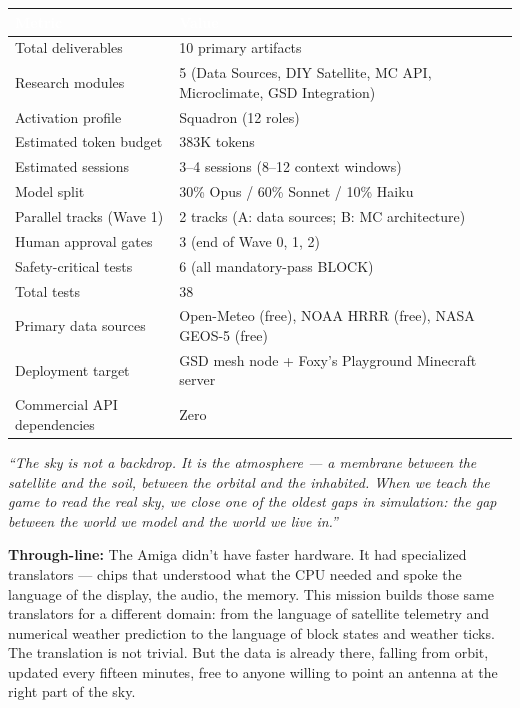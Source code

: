 \documentclass[11pt,letterpaper]{article}
\newcommand{\tableheader}[1]{\textbf{\sffamily\textcolor{white}{#1}}}
\begin{document}
\begin{center}
\begin{tabularx}{\textwidth}{L{4cm}X}
\toprule
{}
\tableheader{Metric} & \tableheader{Value} \\
\midrule
Total deliverables & 10 primary artifacts \\
Research modules & 5 (Data Sources, DIY Satellite, MC API, Microclimate, GSD Integration) \\
Activation profile & Squadron (12 roles) \\
Estimated token budget & 383K tokens \\
Estimated sessions & 3--4 sessions (8--12 context windows) \\
Model split & 30\% Opus / 60\% Sonnet / 10\% Haiku \\
Parallel tracks (Wave 1) & 2 tracks (A: data sources; B: MC architecture) \\
Human approval gates & 3 (end of Wave 0, 1, 2) \\
Safety-critical tests & 6 (all mandatory-pass BLOCK) \\
Total tests & 38 \\
Primary data sources & Open-Meteo (free), NOAA HRRR (free), NASA GEOS-5 (free) \\
Deployment target & GSD mesh node + Foxy's Playground Minecraft server \\
Commercial API dependencies & Zero \\
\bottomrule
\end{tabularx}
\end{center}

\vspace{2em}

\begin{quotebox}
\textit{``The sky is not a backdrop. It is the atmosphere --- a membrane between the satellite and the soil, between the orbital and the inhabited. When we teach the game to read the real sky, we close one of the oldest gaps in simulation: the gap between the world we model and the world we live in.''}

\vspace{0.8em}
\textbf{Through-line:} The Amiga didn't have faster hardware. It had specialized translators --- chips that understood what the CPU needed and spoke the language of the display, the audio, the memory. This mission builds those same translators for a different domain: from the language of satellite telemetry and numerical weather prediction to the language of block states and weather ticks. The translation is not trivial. But the data is already there, falling from orbit, updated every fifteen minutes, free to anyone willing to point an antenna at the right part of the sky.
\end{quotebox}
\end{document}
